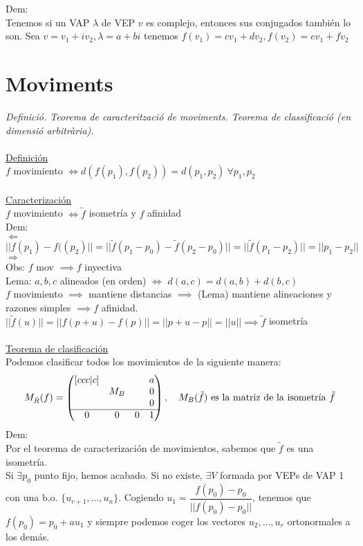 \documentclass{article}
\newcommand{\h}{\hspace{1em}}
\newcommand{\norm}[1]{\lvert\lvert #1 \rvert\rvert}
\begin{document}
Dem: \\
Tenemos si un VAP $\lambda$ de VEP $v$ es complejo, entonces sus conjugados también lo son. Sea $v= v_1 + iv_2,  \lambda = a + bi$ tenemos $f(v_1)=cv_1 + dv_2, f(v_2)=ev_1 + fv_2$

\section{Moviments}
\textit{Definició. Teorema de caracterització de moviments. Teorema de
classificació (en dimensió arbitrària).}\\
\\
\underline{Definición}  \\
$f$ movimiento $\iff d(f(p_1), f(p_2))=d(p_1, p_2) \ \forall p_1, p_2$\\
\\
\underline{Caracterización} \\
$f$ movimiento $\iff \tilde{f}$ isometría y $f$ afinidad\\
Dem:\\
$\Leftarrow$\\
$\norm{f(p_1)-f((p_2)}=\norm{\tilde{f}(p_1-p_0)-\tilde{f}(p_2-p_0)}=\norm{\tilde{f}(p_1-p_2)}=\norm{p_1-p_2}$
\\
$\Rightarrow$\\
Obs: $f$ mov $\implies f$ inyectiva \\
Lema: $a, b, c$ alineados (en orden) $\iff$ $d(a, c) = d(a, b) + d(b, c)$ \\
$f$ movimiento $\implies$ mantiene distancias $\implies$ (Lema) mantiene alineaciones y razones simples $\implies f$ afinidad. \\
$\norm{\tilde{f}(u)}= \norm{f(p+u)-f(p)} =\norm{p+u-p}= \norm{u} \implies \tilde{f}$ isometría\\
\\
\underline{Teorema de clasificación} \\
Podemos clasificar todos los movimientos de la siguiente manera:
\[
M_{\Bar{R}}(f) = 
\begin{pmatrix}[ccc|c]
     &  &  & a  \\
     & M_B &  & 0 \\
    & &  & 0   \\
    \hline
    0 & 0 & 0 & 1 \\
\end{pmatrix}, \h M_B(\tilde{f})\text{ es la matriz de la isometría }\tilde{f} 
\]
Dem:\\
Por el teorema de caracterización de movimientos, sabemos que $\tilde{f}$ es una isometría.\\
Si $\exists p_0$ punto fijo, hemos acabado. Si no existe, $\exists V$ formada por VEPs de VAP 1 con una b.o. $\{u_{r+1}, \ldots, u_n\}$. Cogiendo $u_1 = \dfrac{f(p_0)-p_0}{\norm{f(p_0)-p_0}}$, tenemos que $f(p_0)=p_0+a u_1$ y siempre podemos coger los vectores $u_2, \ldots, u_r$ ortonormales a los demás.
\end{document}
